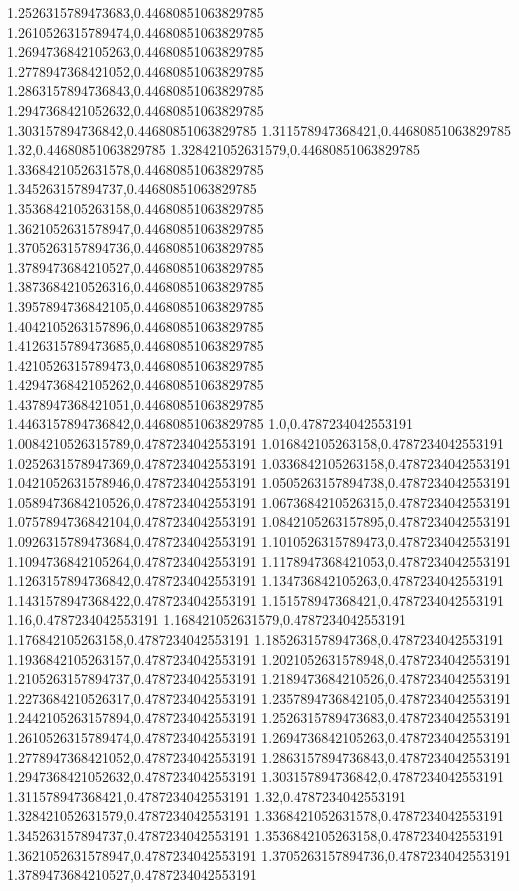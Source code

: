 1.2526315789473683,0.44680851063829785
1.2610526315789474,0.44680851063829785
1.2694736842105263,0.44680851063829785
1.2778947368421052,0.44680851063829785
1.2863157894736843,0.44680851063829785
1.2947368421052632,0.44680851063829785
1.303157894736842,0.44680851063829785
1.311578947368421,0.44680851063829785
1.32,0.44680851063829785
1.328421052631579,0.44680851063829785
1.3368421052631578,0.44680851063829785
1.345263157894737,0.44680851063829785
1.3536842105263158,0.44680851063829785
1.3621052631578947,0.44680851063829785
1.3705263157894736,0.44680851063829785
1.3789473684210527,0.44680851063829785
1.3873684210526316,0.44680851063829785
1.3957894736842105,0.44680851063829785
1.4042105263157896,0.44680851063829785
1.4126315789473685,0.44680851063829785
1.4210526315789473,0.44680851063829785
1.4294736842105262,0.44680851063829785
1.4378947368421051,0.44680851063829785
1.4463157894736842,0.44680851063829785
1.0,0.4787234042553191
1.0084210526315789,0.4787234042553191
1.016842105263158,0.4787234042553191
1.0252631578947369,0.4787234042553191
1.0336842105263158,0.4787234042553191
1.0421052631578946,0.4787234042553191
1.0505263157894738,0.4787234042553191
1.0589473684210526,0.4787234042553191
1.0673684210526315,0.4787234042553191
1.0757894736842104,0.4787234042553191
1.0842105263157895,0.4787234042553191
1.0926315789473684,0.4787234042553191
1.1010526315789473,0.4787234042553191
1.1094736842105264,0.4787234042553191
1.1178947368421053,0.4787234042553191
1.1263157894736842,0.4787234042553191
1.134736842105263,0.4787234042553191
1.1431578947368422,0.4787234042553191
1.151578947368421,0.4787234042553191
1.16,0.4787234042553191
1.168421052631579,0.4787234042553191
1.176842105263158,0.4787234042553191
1.1852631578947368,0.4787234042553191
1.1936842105263157,0.4787234042553191
1.2021052631578948,0.4787234042553191
1.2105263157894737,0.4787234042553191
1.2189473684210526,0.4787234042553191
1.2273684210526317,0.4787234042553191
1.2357894736842105,0.4787234042553191
1.2442105263157894,0.4787234042553191
1.2526315789473683,0.4787234042553191
1.2610526315789474,0.4787234042553191
1.2694736842105263,0.4787234042553191
1.2778947368421052,0.4787234042553191
1.2863157894736843,0.4787234042553191
1.2947368421052632,0.4787234042553191
1.303157894736842,0.4787234042553191
1.311578947368421,0.4787234042553191
1.32,0.4787234042553191
1.328421052631579,0.4787234042553191
1.3368421052631578,0.4787234042553191
1.345263157894737,0.4787234042553191
1.3536842105263158,0.4787234042553191
1.3621052631578947,0.4787234042553191
1.3705263157894736,0.4787234042553191
1.3789473684210527,0.4787234042553191
